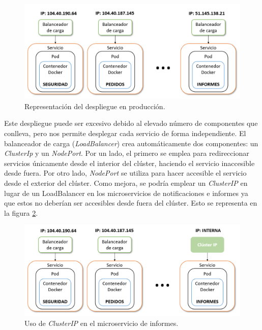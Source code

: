 \documentclass[11pt,spanish,listoffigures]{tfgetsinf}
\begin{document}
\begin{figure}[h]
\centering
\includegraphics[scale=0.65]{DespliegueProduccion}
\caption{Representación del despliegue en producción.}
\label{fig:DespliegueProduccion}
\end{figure}

Este despliegue puede ser excesivo debido al elevado número de componentes que conlleva, pero nos permite desplegar cada servicio de forma independiente. El balanceador de carga (\textit{LoadBalancer}) crea automáticamente dos componentes: un \textit{ClusterIp} y un \textit{NodePort}. Por un lado, el primero se emplea para redireccionar servicios únicamente desde el interior del clúster, haciendo el servicio inaccesible desde fuera. Por otro lado, \textit{NodePort} se utiliza para hacer accesible el servicio desde el exterior del clúster. Como mejora, se podría emplear un \textit{ClusterIP} en lugar de un LoadBalancer en los microservicios de notificaciones e informes ya que estos no deberían ser accesibles desde fuera del clúster. Esto se representa en la figura \ref{fig:ClusterIP}.

\begin{figure}[h]
\centering
\includegraphics[scale=0.65]{ClusterIP}
\caption{Uso de \textit{ClusterIP} en el microservicio de informes.}
\label{fig:ClusterIP}
\end{figure}

\newpage
\end{document}
